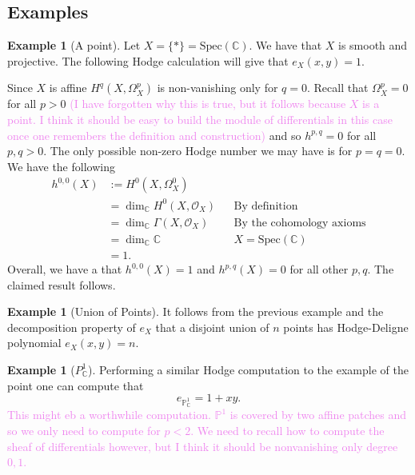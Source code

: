 \documentclass{article}
\theoremstyle{definition}
\newtheorem{example}[theorem]{Example}
\theoremstyle{remark}
\newcommand{\wg}[1]{\textcolor{violet}{#1}}
\newcommand{\C}{\mathbb C}
\newcommand{\Spec}[1]{\text{Spec}(#1)}
\newcommand{\OX}{\mathcal O_X}
\renewcommand{\P}{\mathbb P}
\begin{document}
\subsection{Examples}

\begin{example}[A point]
    Let $X = \{*\} = \Spec \C$. We have that $X$ is smooth and
    projective. The following Hodge calculation will give that $e_X(x,y) = 1$.
    
    Since $X$ is affine $H^q(X, \Omega^p_X)$ is
    non-vanishing only for $q = 0$. 
    Recall that $\Omega^p_X = 0$ for all $p > 0$ \wg{(I have forgotten
    why this is true, but it follows because $X$ is a point. I think
    it should be easy to build the module of differentials in this
    case once one
    remembers the definition and construction)} and so $h^{p,q} = 0$ for all $p,q > 0$.
    The only possible non-zero Hodge number we may have is for $p = q=
    0$. We have the following
    \begin{align*}
        h^{0,0}(X) &:= H^0(X, \Omega_X^0) \\
        &= \dim_\C H^0(X, \OX) && \text{By definition}\\
        &= \dim_\C \Gamma(X, \OX) && \text{By the cohomology axioms} \\
        &= \dim_\C \C  && \text{$X = \Spec \C$ } \\ 
        &= 1.
    \end{align*}
    Overall, we have a that $h^{0,0}(X) = 1$ and 
    $h^{p,q}(X) = 0$ for all other $p,q$. 
    The claimed result follows.
\end{example}

\begin{example}[Union of Points]
   It follows from the previous example and the decomposition property
   of $e_X$ that a disjoint union of $n$ points has Hodge-Deligne
   polynomial $e_X(x,y) = n$. 
\end{example}

\begin{example}[$P^1_\C$]
   Performing a similar Hodge computation to the example of the point
   one can compute that
   \[
        e_{\P^1_\C} = 1 + xy. 
   \]
   \wg{This might eb a worthwhile computation. $\P^1$ is covered by 
   two affine patches and so we only need to compute for $p < 2$. 
   We need to recall how to compute the sheaf of differentials however, but I
   think it should be nonvanishing only degree $0,1$. }
\end{example}
\end{document}
